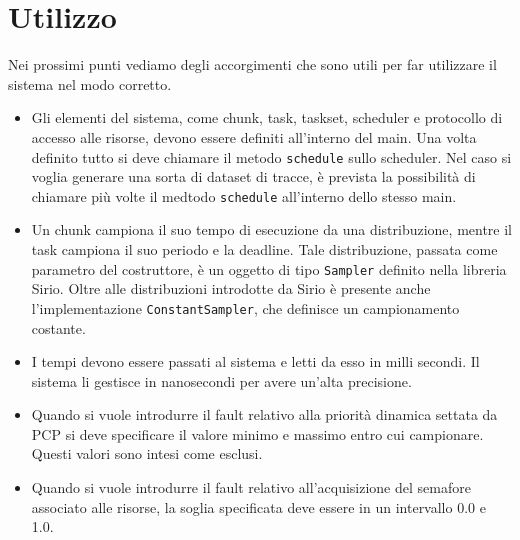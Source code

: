 \section{Utilizzo}
Nei prossimi punti vediamo degli accorgimenti che sono utili per far utilizzare il sistema nel modo corretto.
\begin{itemize}
    \item Gli elementi del sistema, come chunk, task, taskset, scheduler e protocollo di accesso alle risorse, devono essere definiti all'interno del main. Una volta definito tutto si deve chiamare il metodo \texttt{schedule} sullo scheduler. Nel caso si voglia generare una sorta di dataset di tracce, è prevista la possibilità di chiamare più volte il medtodo \texttt{schedule} all'interno dello stesso main.
    \item Un chunk campiona il suo tempo di esecuzione da una distribuzione, mentre il task campiona il suo periodo e la deadline. Tale distribuzione, passata come parametro del costruttore, è un oggetto di tipo \texttt{Sampler} definito nella libreria Sirio. Oltre alle distribuzioni introdotte da Sirio è presente anche l'implementazione \texttt{ConstantSampler}, che definisce un campionamento costante.
    \item I tempi devono essere passati al sistema e letti da esso in milli secondi. Il sistema li gestisce in nanosecondi per avere un'alta precisione.
    \item Quando si vuole introdurre il fault relativo alla priorità dinamica settata da PCP si deve specificare il valore minimo e massimo entro cui campionare. Questi valori sono intesi come esclusi.
    \item Quando si vuole introdurre il fault relativo all'acquisizione del semafore associato alle risorse, la soglia specificata deve essere in un intervallo 0.0 e 1.0.
\end{itemize}